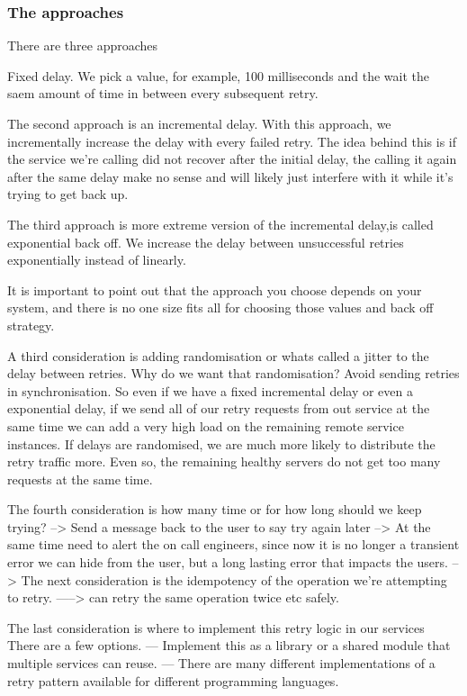 \subsubsection{The approaches}
There are three approaches

Fixed delay.
We pick a value, for example, 100 milliseconds and the wait the saem amount of time in between every subsequent retry.

The second approach is an incremental delay.
With this approach, we incrementally increase the delay with every failed retry.
The idea behind this is if the service we're calling did not recover after the initial delay, the calling it again after the same delay make no sense and will likely just interfere with it while it's trying to get back up.

The third approach is more extreme version of the incremental delay,is called exponential back off.
We increase the delay between unsuccessful retries exponentially instead of linearly.

It is important to point out that the approach you choose depends on your system, and there is no one size fits all for choosing those values and back off strategy.

A third consideration is adding randomisation or whats called a jitter to the delay between retries.
Why do we want that randomisation?
Avoid sending retries in synchronisation.
So even if we have a fixed incremental delay or even a exponential delay, if we send all of our retry requests from out service at the same time we can add a very high load on the remaining remote service instances.
If delays are randomised, we are much more likely to distribute the retry traffic more.
Even so, the remaining healthy servers do not get too many requests at the same time.

The fourth consideration is how many time or for how long should we keep trying?
--> Send a message back to the user to say try again later
-->  At the same time need to alert the on call engineers, since now it is no longer a transient error we can hide from the user, but a long lasting error that impacts the users.
--> The next consideration is the idempotency of the operation we're attempting to retry.
-----> can retry the same operation twice etc safely.

The last consideration is where to implement this retry logic in our services
There are a few options.
--- Implement this as a library or a shared module that multiple services can reuse.
--- There are many different implementations of a retry pattern available for different programming languages.

